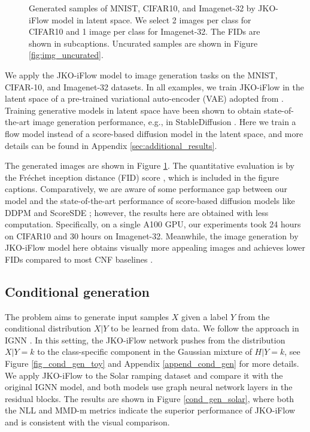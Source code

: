 \documentclass{article}
\theoremstyle{remark}
\theoremstyle{plain}
\newcommand{\JKO}{JKO-iFlow}
\begin{document}
{{\begin{figure}[!t]
\begin{center}
\begin{minipage}{0.445\linewidth}
    \end{minipage}
    \end{center}
    \vspace{-5pt}
    \caption{
    Generated samples of MNIST, CIFAR10, and Imagenet-32 by \JKO{} model in latent space. 
    We select 2 images per class for CIFAR10 and 1 image per class for Imagenet-32. The FIDs are shown in subcaptions.
    Uncurated samples are shown in Figure \ref{fig:img_uncurated}.}
    \label{fig:mnist-cifar-imagenet}
\end{figure}


We apply the \JKO{} model to image generation tasks on the MNIST, CIFAR-10, and Imagenet-32 datasets. In all examples, we train \JKO{} in the latent space of a pre-trained variational auto-encoder (VAE) adopted from \citep{esser2021taming}.
Training generative models in latent space have been shown to obtain state-of-the-art image generation performance, e.g., in StableDiffusion \citep{rombach2022high}. 
Here we train a flow model instead of a score-based diffusion model in the latent space, and more details can be found in Appendix \ref{sec:additional_results}.

%
The generated images are shown in Figure \ref{fig:mnist-cifar-imagenet}. 
The quantitative evaluation is by the Fréchet inception distance (FID) score \citep{heusel2017gans}, which is included in the figure captions.  
Comparatively, we are aware of some performance gap between our model and the state-of-the-art performance of score-based diffusion models like DDPM \citep{ho2020denoising} and ScoreSDE \citep{song2021score}; however, the results here are obtained with less computation. 
%
Specifically, on a single A100 GPU, our experiments took 24 hours on CIFAR10 and 30 hours on Imagenet-32.
%
Meanwhile, the image generation by \JKO{} model here obtains visually more appealing images and achieves lower FIDs compared to most CNF baselines \citep{FFJORD,iResnet,ResFlow,finlay2020train}.}


\subsection{Conditional generation}\label{sec:cond_gen}

The problem aims to generate input samples $X$ given a label $Y$ from the conditional distribution $X|Y$ to be learned from data. 
We follow the approach in IGNN \citep{xu2022invertible}. 
In this setting, the \JKO{} network pushes from the distribution $X|Y=k$ to the class-specific component in the Gaussian mixture of $H|Y=k$, see Figure \ref{fig_cond_gen_toy} and Appendix \ref{append_cond_gen} for more details.
%
%
We apply \JKO{} to the Solar ramping dataset
and compare it with the original IGNN model,
%
and both models use graph neural network layers in the residual blocks. 
The results are shown in Figure \ref{cond_gen_solar}, where both the NLL and MMD-m metrics indicate the superior performance of \JKO{} 
%
and is consistent with the visual comparison.   

}
\end{document}
